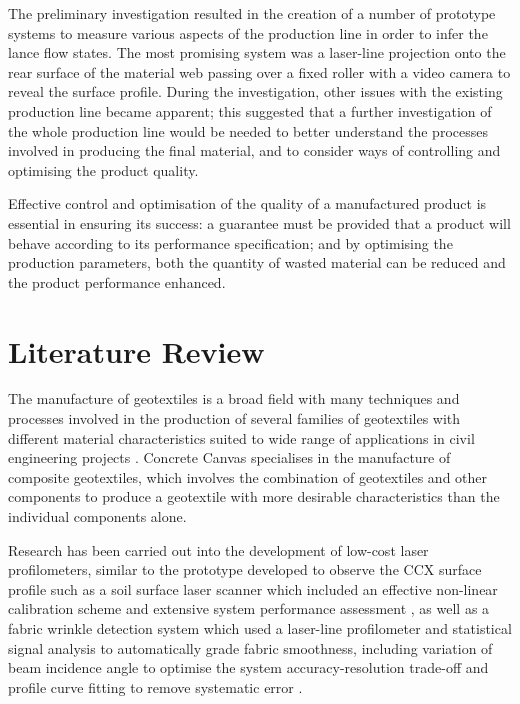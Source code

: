 \documentclass[12pt]{report}
\begin{document}
        The preliminary investigation resulted in the creation of a number of prototype systems to measure various aspects of the production line in order to infer the lance flow states. The most promising system was a laser-line projection onto the rear surface of the material web passing over a fixed roller with a video camera to reveal the surface profile. During the investigation, other issues with the existing production line became apparent; this suggested that a further investigation of the whole production line would be needed to better understand the processes involved in producing the final material, and to consider ways of controlling and optimising the product quality. 
        
        Effective control and optimisation of the quality of a manufactured product is essential in ensuring its success: a guarantee must be provided that a product will behave according to its performance specification; and by optimising the production parameters, both the quantity of wasted material can be reduced and the product performance enhanced.


    \section{Literature Review}
        The manufacture of geotextiles is a broad field with many techniques and processes involved in the production of several families of geotextiles \cite{berube2016manufacturing} with different material characteristics suited to wide range of applications in civil engineering projects \cite{ingold2013geotextiles}. Concrete Canvas specialises in the manufacture of composite geotextiles, which involves the combination of geotextiles and other components to produce a geotextile with more desirable characteristics than the individual components alone.
        
        Research has been carried out into the development of low-cost laser profilometers, similar to the prototype developed to observe the CCX surface profile such as a soil surface laser scanner which included an effective non-linear calibration scheme and extensive system performance assessment \cite{Darboux2003}, as well as a fabric wrinkle detection system which used a laser-line profilometer and statistical signal analysis to automatically grade fabric smoothness, including variation of beam incidence angle to optimise the system accuracy-resolution trade-off and profile curve fitting to remove systematic error \cite{Xu1998}.
        
\end{document}
